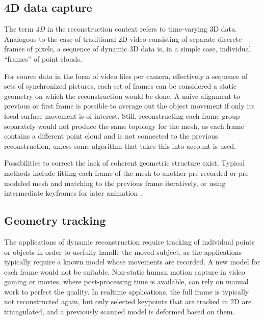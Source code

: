 
\subsection{4D data capture} %

The term \emph{4D} in the reconstruction context refers to time-varying 3D data.
Analogous to the case of traditional 2D video consisting of separate discrete frames of pixels, a sequence of dynamic 3D data is, in a simple case, individual ``frames'' of point clouds.

For source data in the form of video files per camera, effectively a sequence of sets of synchronized pictures, each set of frames can be considered a static geometry on which the reconstruction would be done.
A naive alignment to previous or first frame is possible to average out the object movement if only its local surface movement is of interest.
Still, reconstructing each frame group separately would not produce the same topology for the mesh, as each frame contains a different point cloud and is not connected to the previous reconstruction, unless some algorithm that takes this into account is used.

Possibilities to correct the lack of coherent geometric structure exist.
Typical methods include fitting each frame of the mesh to another pre-recorded or pre-modeled mesh \cite{bickel2007multi,bradley2010high,li2009robust,zhang2007spacetime} and matching to the previous frame iteratively, or using intermediate keyframes for later animation \cite{beeler2011high}.

\subsection{Geometry tracking} %

The applications of dynamic reconstruction require tracking of individual points or objects in order to usefully handle the moved subject, as the applications typically require a known model whose movements are recorded.
A new model for each frame would not be suitable.
Non-static human motion capture in video gaming or movies, where post-processing time is available, can rely on manual work to perfect the quality.
In realtime applications, the full frame is typically not reconstructed again, but only selected keypoints that are tracked in 2D are triangulated, and a previously scanned model is deformed based on them.

